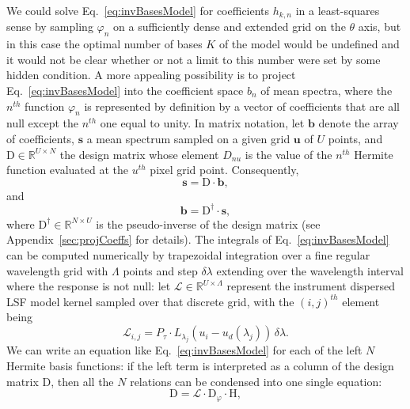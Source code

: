 \documentclass{aa}
\newcommand{\pupil}{\ensuremath{P_\tau}}
\newcommand{\equref}[1]{Eq.~\ref{eq:#1}}
\newcommand{\appref}[1]{Appendix~\ref{sec:#1}}
\begin{document}
We could solve \equref{invBasesModel} for coefficients $h_{k,n}$ in a least-squares sense by sampling $\varphi_n$ on a sufficiently dense and extended grid on the $\theta$ axis, but in this case 
the optimal number of bases $K$ of the model would be undefined and it would not be clear whether or not a limit to this number were set by some hidden condition.
A more appealing possibility is to project \equref{invBasesModel} into the coefficient space $b_n$ of mean spectra, where the $n^{th}$ function $\varphi_n$ is represented by definition by a vector of  coefficients that are all null except the $n^{th}$ one equal to unity. 
 In matrix notation, let $\textbf{b}$ denote the array of coefficients,
 $\textbf{s}$ a mean spectrum sampled on a given grid $\textbf{u}$ of $U$ points,
 and $\mathrm{D}\! \in\mathbb{R}^{U\times N}$  the design matrix whose element $D_{nu}$ is the value of the $n^{th}$ Hermite function evaluated at the $u^{th}$ pixel grid point. Consequently, 
\begin{equation}
    \label{eq:sampledSpec}
    \textbf{s} = \mathrm{D} \cdot \textbf{b}
,\end{equation}
and
\begin{equation}
   \label{eq:coeffsProjection}
   \textbf{b} = \mathrm{D}^\dagger \cdot \textbf{s}
,\end{equation}
where 
$\mathrm{D}^\dagger\! \in\mathbb{R}^{N\times U}$ is the 
pseudo-inverse of the design matrix (see  \appref{projCoeffs} for details).
The integrals of \equref{invBasesModel} can be computed numerically by trapezoidal integration over a fine regular wavelength grid  
with $\Lambda$ points and step $\delta\lambda$ extending over the wavelength interval where the response is not null: let $\mathcal{L}\! \in\mathbb{R}^{U \times \Lambda}$ represent the instrument dispersed LSF model kernel sampled over that discrete grid, with the $(i, j)^{th}$ element being 
\begin{equation}
   \mathcal{L}_{i, j} = \pupil \cdot L_{\lambda_j}\left(u_i - u_d(\lambda_j)\right) \, \delta\lambda
.\end{equation}
We can write an equation like \equref{invBasesModel} for each of the left $N$ Hermite basis functions: if the left term is interpreted as a column of the design matrix $\mathrm{D}$, then all the $N$ relations can be condensed into one single equation:
\begin{equation}
    \label{eq:invBasesModelMatrix}
    \mathrm{D} =  \mathcal{L} \cdot \mathrm{D}_\varphi \cdot \mathrm{H}
,\end{equation}
\end{document}
